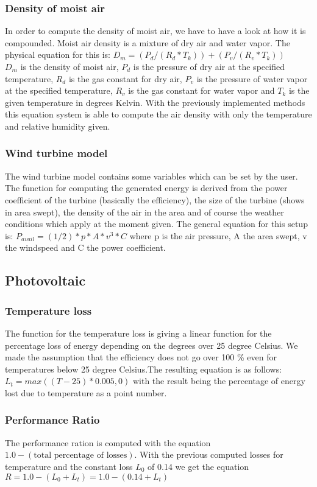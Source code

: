 \subsubsection{Density of moist air}
In order to compute the density of moist air, we have to have a look at how it is compounded. Moist air density is a mixture of dry air and water vapor. The physical equation for this is: $D_m = (P_d/(R_d * T_k))+(P_v/(R_v*T_k))$\\
$D_m$ is the density of moist air, $P_d$ is the pressure of dry air at the specified temperature, $R_d$ is the gas constant for dry air, $P_v$ is the pressure of water vapor at the specified temperature, $R_v$ is the gas constant for water vapor and $T_k$ is the given temperature in degrees Kelvin. With the previously implemented methods this equation system is able to compute the air density with only the temperature and relative humidity given.\cite{AirDensity,Shelquist}
\subsubsection{Wind turbine model}
The wind turbine model contains some variables which can be set by the user. The function for computing the generated energy is derived from the power coefficient of the turbine (basically the efficiency), the size of the turbine (shows in area swept), the density of the air in the area and of course the weather conditions which apply at the moment given.
The general equation for this setup is: $P_{avail} = (1/2) * p * A * v^{3} * C$
where p is the air pressure, A the area swept, v the windspeed and C the power coefficient.\cite{WindPowerCalcs}
\subsection{Photovoltaic}
\subsubsection{Temperature loss}
The function for the temperature loss is giving a linear function for the percentage loss of energy depending on the degrees over 25 degree Celsius. We made the assumption that the efficiency does not go over 100 \% even for temperatures below 25 degree Celsius.The resulting equation is as follows: $L_t = max((T-25)*0.005 , 0)$ with the result being the percentage of energy lost due to temperature as a point number.
\subsubsection{Performance Ratio}
The performance ration is computed with the equation $1.0 - (\text{total percentage of losses})$.
With the previous computed losses for temperature and the constant loss $L_0$ of 0.14 we get the equation $R = 1.0 - (L_0 + L_t) = 1.0 - (0.14 + L_t)$
